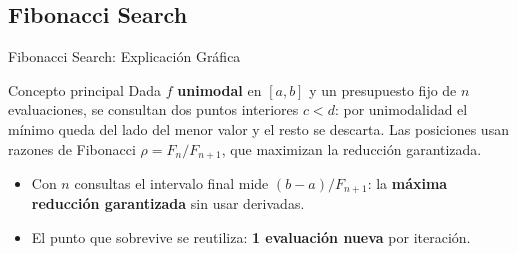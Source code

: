 \subsection{Fibonacci Search}

\begin{frame}{Fibonacci Search: Explicación Gráfica}
    \begin{block}{Concepto principal}
        \footnotesize
        Dada $f$ \textbf{unimodal} en $[a,b]$ y un presupuesto fijo de $n$ evaluaciones,
        se consultan dos puntos interiores $c<d$: por unimodalidad el mínimo queda del
        lado del menor valor y el resto se descarta. Las posiciones usan razones de
        Fibonacci $\rho=F_n/F_{n+1}$, que maximizan la reducción garantizada.
    \end{block}

    \begin{center}
    \end{center}

    \scriptsize
    \begin{itemize}
        \item Con $n$ consultas el intervalo final mide $(b-a)/F_{n+1}$: la
              \textbf{máxima reducción garantizada} sin usar derivadas.
        \item El punto que sobrevive se reutiliza: \textbf{1 evaluación nueva} por iteración.
    \end{itemize}
\end{frame}


